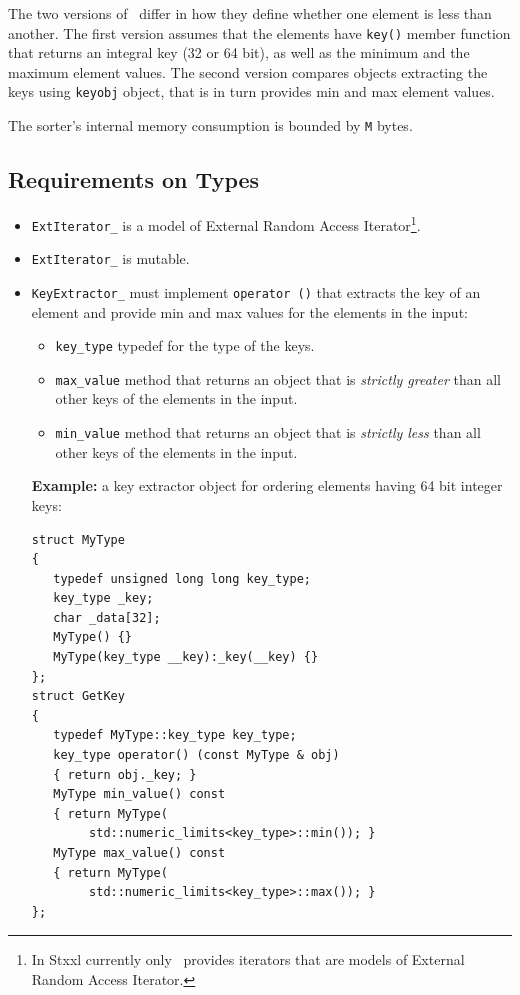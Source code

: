 \documentclass[twoside]{book}
\newcommand{\stxxl}{{\sc Stxxl} }
\begin{document}
The two versions of \xksort\ differ in how they define whether one
element is less than another. The first version assumes that 
the elements have \texttt{key()} member function that returns an
integral key (32 or 64 bit), as well as the minimum and the maximum
element values. The second version compares objects extracting the
keys using \texttt{keyobj} object, that is in turn provides min and
max element values.

The sorter's internal memory consumption is bounded by \texttt{M}
bytes. 

\subsection*{Requirements on Types}

\begin{itemize}
\item \texttt{ExtIterator\_} is a model of External Random Access
Iterator\footnote{In \stxxl currently only \xvector\ provides
iterators that are models of External Random Access Iterator.}. 
\item \texttt{ExtIterator\_} is mutable.
\item \texttt{KeyExtractor\_} must implement \texttt{operator ()} that
extracts the key of an element and provide min and max values for the
elements in the input: 
 \begin{itemize}
 \item \texttt{key\_type} typedef for the type of the keys.
 \item \texttt{max\_value} method that returns an object that is
   \emph{strictly greater} than all other keys of the elements in the
   input.  
 \item \texttt{min\_value} method that returns an object that
    is \emph{strictly less} than all other keys of the elements in the
    input.
 \end{itemize}
 {\bf Example:} 
  a key extractor object for ordering elements having 64 bit integer keys:
\begin{lstlisting}
struct MyType
{
   typedef unsigned long long key_type;
   key_type _key;
   char _data[32];
   MyType() {}
   MyType(key_type __key):_key(__key) {}
};
struct GetKey
{
   typedef MyType::key_type key_type;
   key_type operator() (const MyType & obj)
   { return obj._key; }
   MyType min_value() const 
   { return MyType(
        std::numeric_limits<key_type>::min()); }
   MyType max_value() const 
   { return MyType(
        std::numeric_limits<key_type>::max()); }
};
 \end{lstlisting}


\end{itemize}
\end{document}
